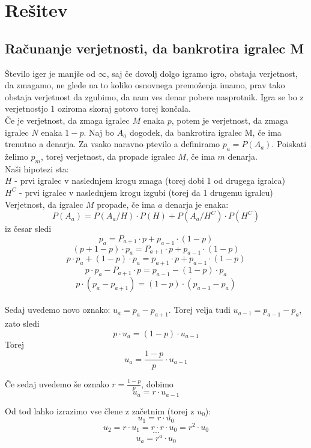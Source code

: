\documentclass[12pt, a4paper]{article}
\begin{document}
\newpage

\section[Rešitev]{Rešitev}
\subsection{Računanje verjetnosti, da bankrotira igralec M}

Število iger je manjše od $\infty$, saj če dovolj dolgo igramo igro, obstaja verjetnost, da zmagamo, ne glede na to koliko osnovnega premoženja imamo, prav tako obstaja verjetnost da zgubimo, da nam ves denar pobere nasprotnik. Igra se bo z verjetnostjo 1 oziroma skoraj gotovo torej končala.\\

Če je verjetnost, da zmaga igralec $M$ enaka $p$, potem je verjetnost, da zmaga igralec $N$ enaka $1-p$. Naj bo $A_a$ dogodek, da bankrotira igralec M, če ima trenutno a denarja. Za vsako naravno ptevilo a definiramo $p_a = P(A_a)$.
Poiskati želimo $p_m$, torej verjetnost, da propade igralec $M$, če ima $m$ denarja. 
\\

Naši hipotezi sta:
\\
$H$ - prvi igralec v naslednjem krogu zmaga (torej dobi 1 od drugega igralca)
\\
$H^C$ - prvi igralec v naslednjem krogu izgubi (torej da 1 drugemu igralcu)
\\

Verjetnost, da igralec $M$ propade, če ima $a$ denarja je enaka:
\\
$$P(A_a) = P(A_a / H) \cdot P(H) + P(A_a / H^C) \cdot P(H^C)$$ iz česar sledi
$$p_a = P_{a+1} \cdot p + p_{a-1} \cdot (1 - p) $$
$$(p + 1 -p) \cdot p_a = P_{a+1} \cdot p + p_{a-1} \cdot (1 - p) $$
$$ p \cdot p_a + (1 - p) \cdot p_a = p_{a+1} \cdot p + p_{a-1} \cdot (1 - p) $$
$$p \cdot p_a - P_{a+1} \cdot p = p_{a-1} - (1-p) \cdot p_a$$
$$p \cdot (p_a - p_{a+1}) = (1-p) \cdot (p_{a-1} - p_a)$$
\\

Sedaj uvedemo novo oznako: $u_a = p_a - p_{a+1}$. Torej velja tudi $u_{a-1} = p_{a-1} - p_a$, zato sledi
$$p \cdot u_a = (1 - p) \cdot u_{a-1}$$
Torej $$u_a = \frac{1-p}{p} \cdot u_{a-1}$$

Če sedaj uvedemo še oznako $r=\frac{1-p}{p}$, dobimo
$$u_a = r \cdot u_{a-1}$$

Od tod lahko izrazimo vse člene z začetnim (torej z $u_0$):
$$u_1 = r \cdot u_0$$
$$u_2 = r \cdot u_1 = r \cdot r \cdot u_0 = r^2 \cdot u_0$$ 
$$\cdots $$
$$u_a = r^a \cdot u_0$$
\newpage
\end{document}
